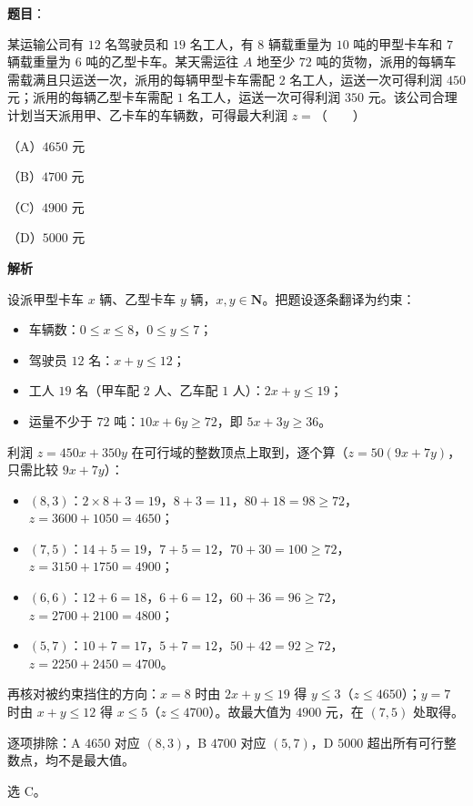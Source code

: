 \begin{answer}

\textbf{题目}：

某运输公司有 $12$ 名驾驶员和 $19$ 名工人，有 $8$ 辆载重量为 $10$ 吨的甲型卡车和 $7$ 辆载重量为 $6$ 吨的乙型卡车。某天需运往 $A$ 地至少 $72$ 吨的货物，派用的每辆车需载满且只运送一次，派用的每辆甲型卡车需配 $2$ 名工人，运送一次可得利润 $450$ 元；派用的每辆乙型卡车需配 $1$ 名工人，运送一次可得利润 $350$ 元。该公司合理计划当天派用甲、乙卡车的车辆数，可得最大利润 $z=$\mbox{（　　）}

（A）$4650$ 元

（B）$4700$ 元

（C）$4900$ 元

（D）$5000$ 元

\textbf{解析}

设派甲型卡车 $x$ 辆、乙型卡车 $y$ 辆，$x,y\in\mathbf N$。把题设逐条翻译为约束：

\begin{itemize}
\item 车辆数：$0\leqslant x\leqslant8$，$0\leqslant y\leqslant7$；
\item 驾驶员 $12$ 名：$x+y\leqslant12$；
\item 工人 $19$ 名（甲车配 $2$ 人、乙车配 $1$ 人）：$2x+y\leqslant19$；
\item 运量不少于 $72$ 吨：$10x+6y\geqslant72$，即 $5x+3y\geqslant36$。
\end{itemize}

利润 $z=450x+350y$ 在可行域的整数顶点上取到，逐个算（$z=50(9x+7y)$，只需比较 $9x+7y$）：

\begin{itemize}
\item $(8,3)$：$2\times8+3=19$，$8+3=11$，$80+18=98\geqslant72$，$z=3600+1050=4650$；
\item $(7,5)$：$14+5=19$，$7+5=12$，$70+30=100\geqslant72$，$z=3150+1750=4900$；
\item $(6,6)$：$12+6=18$，$6+6=12$，$60+36=96\geqslant72$，$z=2700+2100=4800$；
\item $(5,7)$：$10+7=17$，$5+7=12$，$50+42=92\geqslant72$，$z=2250+2450=4700$。
\end{itemize}

再核对被约束挡住的方向：$x=8$ 时由 $2x+y\leqslant19$ 得 $y\leqslant3$（$z\leqslant4650$）；$y=7$ 时由 $x+y\leqslant12$ 得 $x\leqslant5$（$z\leqslant4700$）。故最大值为 $4900$ 元，在 $(7,5)$ 处取得。

逐项排除：A $4650$ 对应 $(8,3)$，B $4700$ 对应 $(5,7)$，D $5000$ 超出所有可行整数点，均不是最大值。

选 C。


\end{answer}
